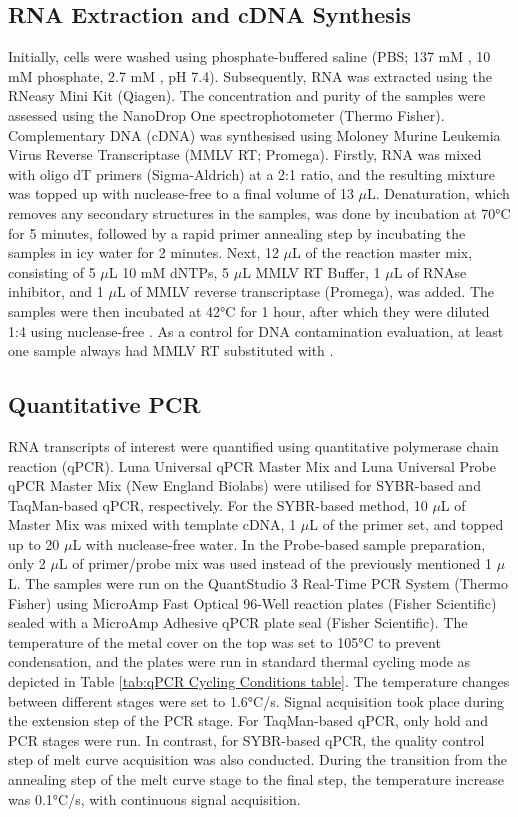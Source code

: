 \subsection{RNA Extraction and cDNA Synthesis} \label{subsec:RNA Extraction and cDNA Synthesis}
Initially, cells were washed using phosphate-buffered saline (PBS; 137 mM , 10 mM phosphate, 2.7 mM , pH 7.4). Subsequently, RNA was extracted using the RNeasy Mini Kit (Qiagen). The concentration and purity of the samples were assessed using the NanoDrop One spectrophotometer (Thermo Fisher). Complementary DNA (cDNA) was synthesised using Moloney Murine Leukemia Virus Reverse Transcriptase (MMLV RT; Promega). Firstly, RNA was mixed with oligo dT primers (Sigma-Aldrich) at a 2:1 ratio, and the resulting mixture was topped up with nuclease-free  to a final volume of 13 \(\mu\)L. Denaturation, which removes any secondary structures in the samples, was done by incubation at 70°C for 5 minutes, followed by a rapid primer annealing step by incubating the samples in icy water for 2 minutes. Next, 12 \(\mu\)L of the reaction master mix, consisting of 5 \(\mu\)L 10 mM dNTPs, 5 \(\mu\)L MMLV RT Buffer, 1 \(\mu\)L of RNAse inhibitor, and 1 \(\mu\)L of MMLV reverse transcriptase (Promega), was added. The samples were then incubated at 42°C for 1 hour, after which they were diluted 1:4 using nuclease-free . As a control for DNA contamination evaluation, at least one sample always had MMLV RT substituted with .

\subsection{Quantitative PCR} \label{subsec:Quantitative PCR}
RNA transcripts of interest were quantified using quantitative polymerase chain reaction (qPCR). Luna Universal qPCR Master Mix and Luna Universal Probe qPCR Master Mix (New England Biolabs) were utilised for SYBR-based and TaqMan-based qPCR, respectively. For the SYBR-based method, 10 \(\mu\)L of Master Mix was mixed with template cDNA, 1 \(\mu\)L of the primer set, and topped up to 20 \(\mu\)L with nuclease-free water. In the Probe-based sample preparation, only 2 \(\mu\)L of primer/probe mix was used instead of the previously mentioned 1 \(\mu\)L. The samples were run on the QuantStudio 3 Real-Time PCR System (Thermo Fisher) using MicroAmp Fast Optical 96-Well reaction plates (Fisher Scientific) sealed with a MicroAmp Adhesive qPCR plate seal (Fisher Scientific). The temperature of the metal cover on the top was set to 105°C to prevent condensation, and the plates were run in standard thermal cycling mode as depicted in Table \ref{tab:qPCR Cycling Conditions table}. The temperature changes between different stages were set to 1.6°C/s. Signal acquisition took place during the extension step of the PCR stage. For TaqMan-based qPCR, only hold and PCR stages were run. In contrast, for SYBR-based qPCR, the quality control step of melt curve acquisition was also conducted. During the transition from the annealing step of the melt curve stage to the final step, the temperature increase was 0.1°C/s, with continuous signal acquisition.


